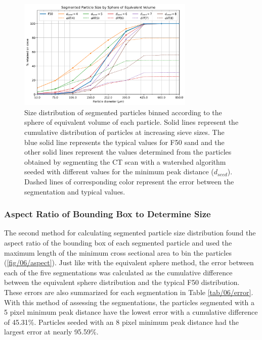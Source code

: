 \begin{figure}[ht]
    \centering
    \includegraphics[width=0.75\textwidth]{figures/06/04-size-by-sphere.png}
    \caption{
        \small{}
        Size distribution of segmented particles binned
        according to the sphere of equivalent volume of each particle.
        Solid lines represent the cumulative distribution of particles at
        increasing sieve sizes. The blue solid line represents the typical
        values for F50 sand and the other solid lines represent the values
        determined from the particles obtained by segmenting the CT scan
        with a watershed algorithm seeded with different values for the
        minimum peak distance ($d_{seed}$). Dashed lines of corresponding
        color represent the error between the segmentation and typical values.
    }
    \label{fig/06/sphere}
\end{figure}

\subsubsection{Aspect Ratio of Bounding Box to Determine Size}
The second method for calculating segmented particle size distribution
found the aspect ratio of the bounding box of each segmented particle and
used the maximum length of the minimum cross sectional area to bin the
particles (\ref{fig/06/aspect}). Just like with the equivalent sphere
method, the error between each
of the five segmentations was calculated as the cumulative difference between
the equivalent sphere distribution and the typical F50 distribution.
These errors are also summarized for each segmentation in Table \ref{tab/06/error}.
With this method of assessing the segmentations, the
particles segmented with a 5 pixel minimum peak distance have the lowest
error with a cumulative difference of 45.31\%. Particles seeded with an
8 pixel minimum peak distance had the largest error at nearly 95.59\%.

